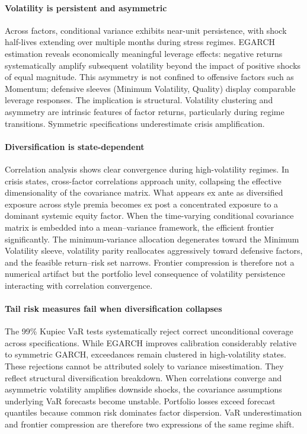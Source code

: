 \documentclass{article}
\begin{document}
\paragraph{Volatility is persistent and asymmetric}

Across factors, conditional variance exhibits near-unit persistence, with shock half-lives extending over multiple months during stress regimes. EGARCH estimation reveals economically meaningful leverage effects: negative returns systematically amplify subsequent volatility beyond the impact of positive shocks of equal magnitude. This asymmetry is not confined to offensive factors such as Momentum; defensive sleeves (Minimum Volatility, Quality) display comparable leverage responses. The implication is structural. Volatility clustering and asymmetry are intrinsic features of factor returns, particularly during regime transitions. Symmetric specifications underestimate crisis amplification.

\paragraph{Diversification is state-dependent}

Correlation analysis shows clear convergence during high-volatility regimes. In crisis states, cross-factor correlations approach unity, collapsing the effective dimensionality of the covariance matrix. What appears ex ante as diversified exposure across style premia becomes ex post a concentrated exposure to a dominant systemic equity factor. When the time-varying conditional covariance matrix is embedded into a mean–variance framework, the efficient frontier significantly. The minimum-variance allocation degenerates toward the Minimum Volatility sleeve, volatility parity reallocates aggressively toward defensive factors, and the feasible return–risk set narrows. Frontier compression is therefore not a numerical artifact but the portfolio level consequence of volatility persistence interacting with correlation convergence.

\paragraph{Tail risk measures fail when diversification collapses}

The 99\% Kupiec VaR tests systematically reject correct unconditional coverage across specifications. While EGARCH improves calibration considerably relative to symmetric GARCH, exceedances remain clustered in high-volatility states. These rejections cannot be attributed solely to variance misestimation. They reflect structural diversification breakdown. When correlations converge and asymmetric volatility amplifies downside shocks, the covariance assumptions underlying VaR forecasts become unstable. Portfolio losses exceed forecast quantiles because common risk dominates factor dispersion. VaR underestimation and frontier compression are therefore two expressions of the same regime shift.\newline
\end{document}

